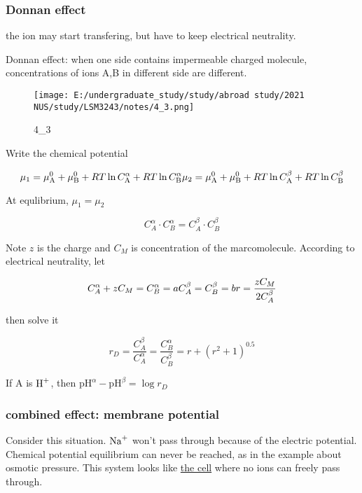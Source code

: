 \hypertarget{donnan-effect}{%
	\subsubsection{Donnan effect}\label{donnan-effect}}

the ion may start transfering, but have to keep electrical neutrality.

Donnan effect: when one side contains impermeable charged molecule,
concentrations of ions A,B in different side are different.

\begin{figure}
	\centering
	\texttt{[image: E:/undergraduate\_study/study/abroad study/2021 NUS/study/LSM3243/notes/4\_3.png]}
	\caption{4\_3}
\end{figure}

Write the chemical potential

\[\mu_1=\mu_{\ce{A}}^0+\mu_{\ce{B}}^0+RT\ln C_{\ce{A}}^\alpha+RT\ln C_{\ce{B}}^\alpha\\
\mu_2=\mu_{\ce{A}}^0+\mu_{\ce{B}}^0+RT\ln C_{\ce{A}}^\beta+RT\ln C_{\ce{B}}^\beta\\\]

At equlibrium, \(\mu_1=\mu_2\)

\[C^\alpha_{A}\cdot C^\alpha_{B}=C^\beta_{A}\cdot C^\beta_{B}\]

Note \(z\) is the charge and \(C_M\) is concentration of the
marcomolecule. According to electrical neutrality, let

\[C^\alpha_{A}+zC_M=C^\alpha_{B}=a\\
C^\beta_{A}= C^\beta_{B}=b\\
r=\dfrac{zC_M}{2C^\beta_{A}}\]

then solve it

\[r_D=\dfrac{C^\beta_{A}}{C^\alpha_{A}}=\dfrac{C^\alpha_{B}}{C^\beta_{B}}=r+\left(r^2+1\right)^{0.5}\]

If A is \(\ce{H+}\), then
\(\mathrm{pH}^\alpha-\mathrm{pH}^\beta=\log r_D\)

\hypertarget{combined-effect-membrane-potential}{%
	\subsubsection{combined effect: membrane
		potential}\label{combined-effect-membrane-potential}}

Consider this situation. \(\ce{Na+}\) won't pass through because of the
electric potential. Chemical potential equilibrium can never be reached,
as in the example about osmotic pressure. This system looks like
\underline{the cell} where no ions can freely pass through.

